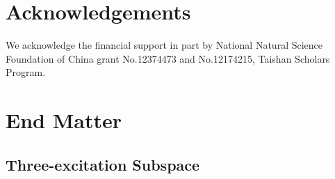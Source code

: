 \documentclass[longbibliography, aps, prx, amsmath, amssymb, amsfonts, twocolumn,superscriptaddress, footinbib]{revtex4-1}
\begin{document}
    \section*{Acknowledgements}
	We acknowledge the financial support in part by National Natural Science Foundation of China grant No.12374473 and No.12174215, Taishan Scholars Program.

	
	

\clearpage

	\section*{End Matter~\label{sec:method}}
	\subsection{Three-excitation Subspace~\label{sec:three_excitation}}
\end{document}
